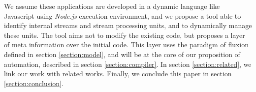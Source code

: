We assume these applications are developed in a dynamic language like Javascript using \textit{Node.js} execution environment, and we propose a tool able to identify internal streams and stream processing units, and to dynamically manage these units.
The tool aims not to modify the existing code, but proposes a layer of meta information over the initial code.
This layer uses the paradigm of fluxion defined in section \ref{section:model}, and will be at the core of our proposition of automation, described in section \ref{section:compiler}.
In section \ref{section:related}, we link our work with related works.
Finally, we conclude this paper in section \ref{section:conclusion}.
